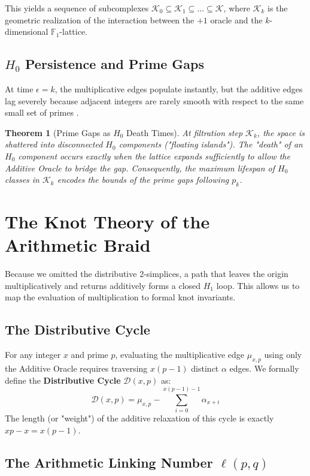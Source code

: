 \documentclass[11pt, a4paper]{article}
\newtheorem{theorem}{Theorem}[section]
\begin{document}
This yields a sequence of subcomplexes $\mathcal{K}_0 \subseteq \mathcal{K}_1 \subseteq \dots \subseteq \mathcal{K}$, where $\mathcal{K}_k$ is the geometric realization of the interaction between the $+1$ oracle and the $k$-dimensional $\mathbb{F}_1$-lattice.

\subsection{$H_0$ Persistence and Prime Gaps}

At time $\epsilon = k$, the multiplicative edges populate instantly, but the additive edges lag severely because adjacent integers are rarely smooth with respect to the same small set of primes \cite{Stormer1897}.

\begin{theorem}[Prime Gaps as $H_0$ Death Times]
At filtration step $\mathcal{K}_k$, the space is shattered into disconnected $H_0$ components ("floating islands"). The "death" of an $H_0$ component occurs exactly when the lattice expands sufficiently to allow the Additive Oracle to bridge the gap. Consequently, the maximum lifespan of $H_0$ classes in $\mathcal{K}_k$ encodes the bounds of the prime gaps following $p_k$.
\end{theorem}

\section{The Knot Theory of the Arithmetic Braid}

Because we omitted the distributive 2-simplices, a path that leaves the origin multiplicatively and returns additively forms a closed $H_1$ loop. This allows us to map the evaluation of multiplication to formal knot invariants.

\subsection{The Distributive Cycle}

For any integer $x$ and prime $p$, evaluating the multiplicative edge $\mu_{x,p}$ using only the Additive Oracle requires traversing $x(p-1)$ distinct $\alpha$ edges. We formally define the \textbf{Distributive Cycle} $\mathcal{D}(x,p)$ as:
\[
\mathcal{D}(x, p) = \mu_{x, p} - \sum_{i=0}^{x(p-1)-1} \alpha_{x+i}
\]
The length (or "weight") of the additive relaxation of this cycle is exactly $xp - x = x(p-1)$.

\subsection{The Arithmetic Linking Number $\ell(p,q)$}
\end{document}
